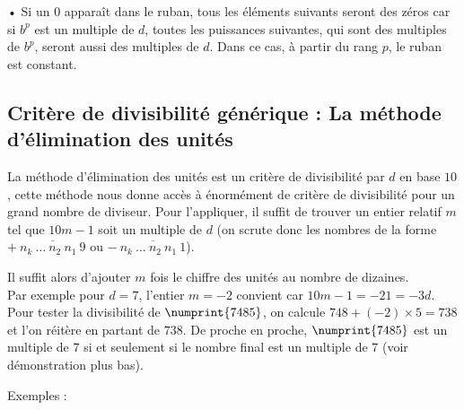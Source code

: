 \documentclass[a4paper, twoside]{article}
\begin{document}
		• Si un $0$ apparaît dans le ruban, tous les éléments suivants seront des zéros car si $b^p$ est un multiple de $d$, toutes les puissances suivantes, qui sont des multiples de $b^p$, seront aussi des multiples de $d$. Dans ce cas, à partir du rang $p$, le ruban est constant.\\

	\vfill

	\newpage















	\subsection{Critère de divisibilité générique : La méthode d'élimination des unités}\label{recherche_critere}

		La méthode d'élimination des unités est un critère de divisibilité par $d$ en base $10$, cette méthode nous donne accès à énormément de critère de divisibilité pour un grand nombre de diviseur. Pour l'appliquer, il suffit de trouver un entier relatif $m$ tel que $10m - 1$ soit un multiple de $d$ (on scrute donc les nombres de la forme $+~\overline{n_{k}~\dots~n_{2}~n_{1}~9}$ ou $-~\overline{n_{k}~\dots~n_{2}~n_{1}~1}$).
		
		Il suffit alors d'ajouter $m$ fois le chiffre des unités au nombre de dizaines.\\
		
		Par exemple pour $d = 7$, l'entier $m = -2$ convient car $10m - 1 = -21 = -3d$. Pour tester la divisibilité de $\numprint{7485}$, on calcule $748 + (-2) \times 5 = 738$ et l'on réitère en partant de $738$. De proche en proche, $\numprint{7485}$ est un multiple de $7$ si et seulement si le nombre final est un multiple de $7$ (voir démonstration plus bas).\\

	\vfill

	{\parindent=0.5cm Exemples :} 

	\vspace{-3mm}
\end{document}
